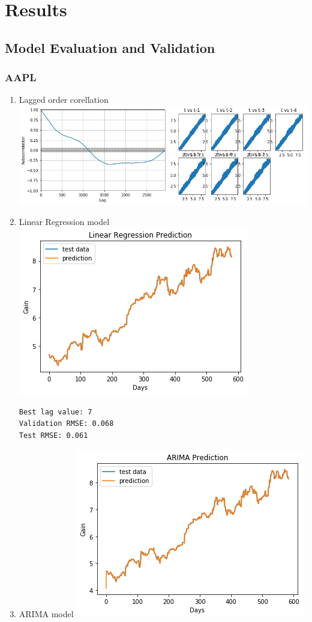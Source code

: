 \documentclass[11pt]{article}
\makeatletter
\def\maxwidth{\ifdim\Gin@nat@width>\linewidth\linewidth
    \else\Gin@nat@width\fi}
\let\Oldincludegraphics\includegraphics
\renewcommand{\includegraphics}[1]{\Oldincludegraphics[width=.8\maxwidth]{#1}}
\makeatother
\begin{document}
\section{Results}\label{results}

\subsection{Model Evaluation and
Validation}\label{model-evaluation-and-validation}

\subsubsection{AAPL}\label{aapl}

\begin{enumerate}
\def\labelenumi{\arabic{enumi}.}
\item
  Lagged order corellation \includegraphics{./figures/19.jpg}
\item
  Linear Regression model \includegraphics{./figures/20.jpg}

\begin{verbatim}
Best lag value: 7
Validation RMSE: 0.068
Test RMSE: 0.061
\end{verbatim}
\item
  ARIMA model \includegraphics{./figures/21.jpg}
\end{enumerate}
\end{document}
